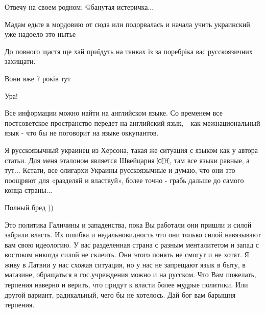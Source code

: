 \begin{itemize}
\begin{itemize}
\end{itemize}

Отвечу на своем родном: @банутая истеричка...

Мадам едьте в мордовию от сюда или подорвалась и начала учить украинский уже надоело это нытье

До повного щастя ще хай приїдуть на танках із за поребріка вас русскоязичних захищати.

\begin{itemize}
Вони вже 7 років тут

Ура!
\end{itemize}

Все информации можно найти на английском языке. Со временем все постсоветское
пространство передет на английский язык, - как межнациональный язык - что бы не
поговорит на языке оккупантов.



Я русскоязычный украинец из Херсона, такая же ситуация с языком как у автора
статьи. Для меня эталоном является Швейцария 🇨🇭, там все языки равные, а
тут... Кстати, все олигархи Украины русскоязычные и думаю, что они это поощряют
для «разделяй и властвуй», более точно - грабь дальше до самого конца страны...

Полный бред ))


Это политика Галичины и западенства, пока Вы работали они пришли и силой
забрали власть. Их ошибка и недальновидность что они только силой навязывают
вам свою идеологию. У вас разделенная страна с разным менталитетом и запад с
востоком никогда силой не склеить. Они этого понять не смогут и не хотят. Я
живу в Латвии у нас схожая ситуация, но у нас не запрещают язык в быту, в
магазине, обращаться в гос.учреждения можно и на русском. Что Вам пожелать,
терпения наверно и верить, что придут к власти более мудрые политики. Или
другой вариант, радикальный, чего бы не хотелось. Дай бог вам барышня терпения.


\end{itemize}
